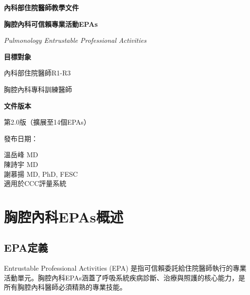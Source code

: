 \documentclass[12pt,a4paper]{article}
\newcommand{\mydate}{\DTMtoday}
\begin{document}
\begin{titlepage}
    \centering
    {\LARGE\textcolor{emergency_red}{\textbf{內科部住院醫師教學文件}}\par}
    \vspace{1cm}
    {\huge\bfseries 胸腔內科可信賴專業活動EPAs\par}
    \vspace{0.5cm}
    {\Large\textcolor{emergency_blue}{\textit{Pulmonology Entrustable Professional Activities}}\par}
    \vspace{1cm}
    
    \begin{tcolorbox}[
        colback=emergency_blue!5!white,
        colframe=emergency_blue,
        width=0.8\textwidth,
        arc=10pt,
        boxrule=1pt
    ]
    \centering
    {\large\textbf{目標對象}\par}
    \vspace{0.3cm}
    內科部住院醫師R1-R3\par
    胸腔內科專科訓練醫師\par
    \vspace{0.5cm}
    {\large\textbf{文件版本}\par}
    \vspace{0.3cm}
    第2.0版（擴展至14個EPAs）\par
    發布日期：\mydate\par
    \end{tcolorbox}

    \vfill
    
    {\large 溫岳峰 MD\\陳詩宇 MD \\謝慕揚 MD, PhD, FESC\\
    適用於CCC評量系統\par}
    
    \vspace{0.5cm}
\end{titlepage}

\newpage
\tableofcontents
\newpage

\section{胸腔內科EPAs概述}

\subsection{EPA定義}
Entrustable Professional Activities (EPA) 是指可信賴委託給住院醫師執行的專業活動單元。胸腔內科EPAs涵蓋了呼吸系統疾病診斷、治療與照護的核心能力，是所有胸腔內科醫師必須精熟的專業技能。
\end{document}
